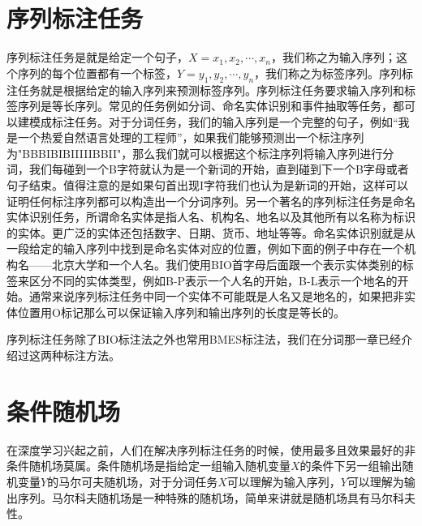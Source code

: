 \documentclass[twoside,a4paper,12pt]{book}%
\begin{document}
\section{序列标注任务}
序列标注任务是就是给定一个句子，$X=x_1,x_2,\cdots,x_n$，我们称之为输入序列；这个序列的每个位置都有一个标签，$Y=y_1,y_2,\cdots,y_n$，我们称之为标签序列。序列标注任务就是根据给定的输入序列来预测标签序列。序列标注任务要求输入序列和标签序列是等长序列。常见的任务例如分词、命名实体识别和事件抽取等任务，都可以建模成标注任务。对于分词任务，我们的输入序列是一个完整的句子，例如“我是一个热爱自然语言处理的工程师”，如果我们能够预测出一个标注序列为"BBBIBIBIIIIIBBII"，那么我们就可以根据这个标注序列将输入序列进行分词，我们每碰到一个B字符就认为是一个新词的开始，直到碰到下一个B字母或者句子结束。值得注意的是如果句首出现I字符我们也认为是新词的开始，这样可以证明任何标注序列都可以构造出一个分词序列。另一个著名的序列标注任务是命名实体识别任务，所谓命名实体是指人名、机构名、地名以及其他所有以名称为标识的实体。更广泛的实体还包括数字、日期、货币、地址等等。命名实体识别就是从一段给定的输入序列中找到是命名实体对应的位置，例如下面的例子中存在一个机构名——北京大学和一个人名。我们使用BIO首字母后面跟一个表示实体类别的标签来区分不同的实体类型，例如B-P表示一个人名的开始，B-L表示一个地名的开始。通常来说序列标注任务中同一个实体不可能既是人名又是地名的，如果把非实体位置用O标记那么可以保证输入序列和输出序列的长度是等长的。
\begin{table}[h]
	\caption{序列标注任务举例}  
	\centering
\end{table}

序列标注任务除了BIO标注法之外也常用BMES标注法，我们在分词那一章已经介绍过这两种标注方法。

\section{条件随机场}
在深度学习兴起之前，人们在解决序列标注任务的时候，使用最多且效果最好的非条件随机场莫属。条件随机场是指给定一组输入随机变量$X$的条件下另一组输出随机变量$Y$的马尔可夫随机场，对于分词任务$X$可以理解为输入序列，$Y$可以理解为输出序列。马尔科夫随机场是一种特殊的随机场，简单来讲就是随机场具有马尔科夫性。
\end{document}
